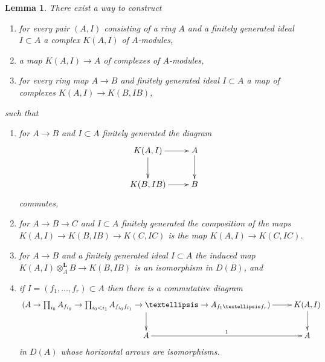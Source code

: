 \documentclass{stacks-project}
\theoremstyle{plain}
\newtheorem{lemma}[subsection]{Lemma}
\theoremstyle{definition}
\theoremstyle{remark}
\numberwithin{equation}{subsection}
\begin{document}
\begin{lemma}
\label{lemma-all-rings}
There exist a way to construct
\begin{enumerate}
\item for every pair $(A, I)$ consisting of a ring $A$ and a finitely
generated ideal $I \subset A$ a complex $K(A, I)$ of $A$-modules,
\item a map $K(A, I) \to A$ of complexes of $A$-modules,
\item for every ring map $A \to B$ and finitely generated ideal $I \subset A$
a map of complexes $K(A, I) \to K(B, IB)$,
\end{enumerate}
such that
\begin{enumerate}
\item[(a)] for $A \to B$ and $I \subset A$ finitely generated the diagram
$$
\xymatrix{
K(A, I) \ar[r] \ar[d] & A \ar[d] \\
K(B, IB) \ar[r] & B
}
$$
commutes,
\item[(b)] for $A \to B \to C$ and $I \subset A$ finitely generated
the composition of the maps
$K(A, I) \to K(B, IB) \to K(C, IC)$ is the map $K(A, I) \to K(C, IC)$.
\item[(c)] for $A \to B$ and a finitely generated ideal $I \subset A$
the induced map $K(A, I) \otimes_A^\mathbf{L} B \to K(B, IB)$
is an isomorphism in $D(B)$, and
\item[(d)] if $I = (f_1, \ldots, f_r) \subset A$ then there is a commutative
diagram
$$
\xymatrix{
(A \to \prod\nolimits_{i_0} A_{f_{i_0}} \to
\prod\nolimits_{i_0 < i_1} A_{f_{i_0}f_{i_1}} \to
\ldots \to A_{f_1\ldots f_r}) \ar[r] \ar[d] &  K(A, I) \ar[d] \\
A \ar[r]^1 & A
}
$$
in $D(A)$ whose horizontal arrows are isomorphisms.
\end{enumerate}
\end{lemma}
\end{document}
